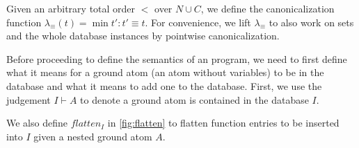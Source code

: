 Given an arbitrary total order $<$ over $N\cup C$,
we define the canonicalization function $\lambda_{\equiv}(t)=\min t':t'\equiv t$.
For convenience, we lift $\lambda_{\equiv}$ to 
 also work on sets 
 and the whole database instances by pointwise canonicalization.

Before proceeding to define the semantics of an \egglog program,
 we need to first define what it means for a ground atom (an atom without variables)
 to be in the database and what it means to add one to the database.
First, we use the judgement $I\vdash A$ 
 to denote a ground atom is contained in the database $I$.

\def\flatten{\textit{flatten}}
\def\aux{\textit{aux}}

We also define $\flatten{}_I$ in \autoref{fig:flatten}
 to flatten function entries to be inserted 
 into $I$ given a nested ground atom $A$.

